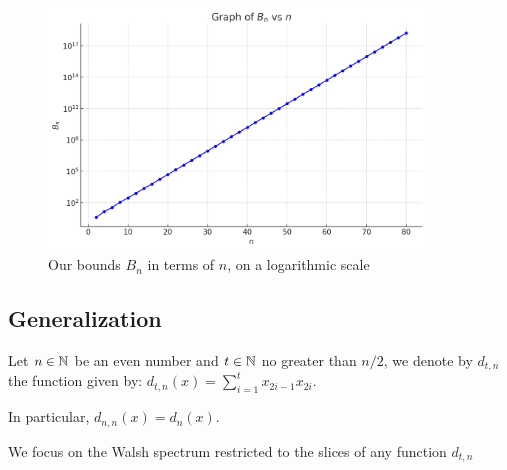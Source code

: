 \documentclass[11pt]{llncs}
\begin{document}
\begin{figure}
    \centering
    \includegraphics[width=10cm]{walsh_bound}
    \caption{Our bounds $B_n$ in terms of $n$, on a logarithmic scale}
    \label{fig:walsh_bound}
\end{figure}





\subsection{Generalization}

\begin{definition}
	Let $n\in \mathbb{N}$ be an even number and $t \in \mathbb{N} $ no greater than $n/2$, we denote by $d_{t,n}$ the function given by: $d_{t,n}(x)=\sum_{i=1}^t x_{2i-1} x_{2i}$.
	
\end{definition}

In particular, $d_{n,n}(x)=d_n(x)$. 

We focus on the Walsh spectrum restricted to the slices of any function $d_{t,n}$
\end{document}
